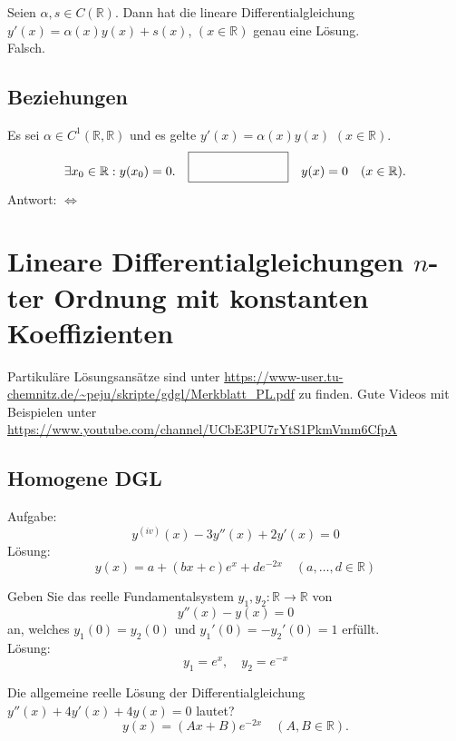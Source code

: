\documentclass[parskip=full]{scrartcl}
\begin{document}
Seien $\alpha, s \in C(\mathbb{R})$.
Dann hat die lineare Differentialgleichung $y'(x) = \alpha(x)y(x) + s(x)$, $(x \in \mathbb{R})$ genau eine Lösung.\\
Falsch.

\subsection{Beziehungen}
Es sei $\alpha \in C^1(\mathbb{R}, \mathbb{R})$ und es gelte $y'(x) = \alpha(x) y(x)$ $(x \in \mathbb{R})$.
\begin{displaymath}
  \exists x_0 \in \mathbb{R} : y(x_0) = 0.
  \quad \fbox{\rule{1in}{0pt}\rule[-0.5ex]{0pt}{4ex}} \quad
  y(x) = 0 \quad (x \in \mathbb{R}).
\end{displaymath}
Antwort: $\iff$

\section{Lineare Differentialgleichungen $n$-ter Ordnung mit konstanten Koeffizienten}
Partikuläre Lösungsansätze sind unter \url{https://www-user.tu-chemnitz.de/~peju/skripte/gdgl/Merkblatt_PL.pdf} zu finden.
Gute Videos mit Beispielen unter \url{https://www.youtube.com/channel/UCbE3PU7rYtS1PkmVmm6CfpA}

\subsection{Homogene DGL}
Aufgabe:
\begin{displaymath}
  y^{(iv)}(x) - 3y''(x) + 2y'(x) = 0
\end{displaymath}
Lösung:
\begin{displaymath}
  y(x) = a + (bx + c)e^x + de^{-2x} \quad (a, \dots, d \in \mathbb{R})
\end{displaymath}

Geben Sie das reelle Fundamentalsystem $y_1, y_2 : \mathbb{R} \to \mathbb{R}$ von
\begin{displaymath}
  y''(x) - y(x) = 0
\end{displaymath}
an, welches $y_1(0) = y_2(0)$ und $y_1'(0) = -y_2'(0) = 1$ erfüllt.\\
Lösung:
\begin{displaymath}
  y_1 = e^x, \quad y_2 = e^{-x}
\end{displaymath}

Die allgemeine reelle Lösung der Differentialgleichung $y''(x) + 4y'(x) + 4y(x) = 0$ lautet?
\begin{displaymath}
  y(x) = (Ax + B) e^{-2x} \quad (A,B \in \mathbb{R}).
\end{displaymath}
\end{document}
